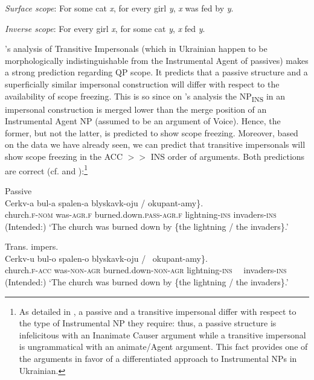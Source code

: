 \documentclass[output=paper,colorlinks,citecolor=brown]{langscibook}
\begin{document}
\textit{Surface scope}: For some cat \textit{x}, for every girl \textit{y}, \textit{x} was fed by \textit{y}.

\textit{Inverse scope}: For every girl \textit{x}, for some cat \textit{y}, \textit{x} fed \textit{y}.
    \z

\noindent \citeauthor{Lavine2023}'s analysis of Transitive Impersonals (which in Ukrainian happen to be morphologically indistinguishable from the Instrumental Agent of passives) makes a strong prediction regarding QP scope. It predicts that a passive structure and a superficially similar impersonal construction will differ with respect to the availability of scope freezing. This is so since on \citeauthor{Lavine2023}'s analysis the NP\textsubscript{INS} in an impersonal construction is merged lower than the merge position of an Instrumental Agent NP (assumed to be an argument of Voice). Hence, the former, but not the latter, is predicted to show scope freezing. Moreover, based on the data we have already seen, we can predict that transitive impersonals will show scope freezing in the ACC $>>$ INS order of arguments. Both predictions are correct (cf.  and ):\footnote{\textrm{As detailed in \citet{Lavine2022, Lavine2023}, a passive and a transitive impersonal differ with respect to the type of Instrumental NP they require: thus, a passive structure is infelicitous with an Inanimate Causer argument while a transitive impersonal is ungrammatical with an animate/Agent argument. This fact provides one of the arguments in favor of a differentiated approach to Instrumental NPs in Ukrainian.}}

\ea%
    \label{ex:antonyuk:34}

\ea
Passive\\
\gll    Cerkv-a   bul-a spalen-a       \minsp{\{\#} blyskavk-oju / okupant-amy\}. \\
  church.\textsc{f}-\textsc{nom}   was-\textsc{agr.f} burned.down.\textsc{pass-agr.f} {} lightning-\textsc{ins} {} invaders-\textsc{ins}\\
\glt (Intended:) ‘The church was burned down by \{the lightning / the invaders\}.’

 \ex
 Trans. impers.\\
\gll   Cerkv-u                           bul-o                spalen-o                  \minsp{\{} blyskavk-oju           /  \minsp{\#}~okupant-amy\}.  \\
        church.\textsc{f}-\textsc{acc}   was-\textsc{non-agr} burned.down-\textsc{non-agr}  {}     lightning-\textsc{ins} {} ~~invaders-\textsc{ins}\\
\glt (Intended:) ‘The church was burned down by \{the lightning / the invaders\}.’
    \z
    \z
\end{document}
